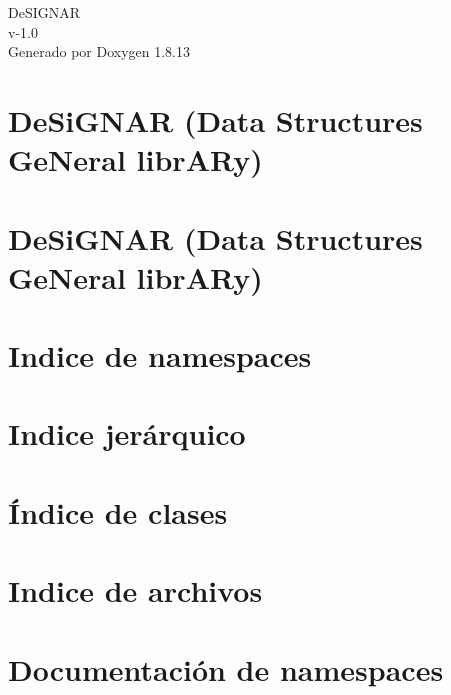 \documentclass[twoside]{book}
\newcommand{\+}{\discretionary{\mbox{\scriptsize$\hookleftarrow$}}{}{}}
\newcommand{\clearemptydoublepage}{%
  \newpage{\pagestyle{empty}\cleardoublepage}%
}
\begin{document}
\hypersetup{pageanchor=false,
             bookmarksnumbered=true,
             pdfencoding=unicode
            }
\begin{titlepage}
\vspace*{7cm}
\begin{center}%
{\Large De\+S\+I\+G\+N\+AR \\[1ex]\large v-\/1.\+0 }\\
\vspace*{1cm}
{\large Generado por Doxygen 1.8.13}\\
\end{center}
\end{titlepage}
\clearemptydoublepage
{}
\tableofcontents
\clearemptydoublepage
{}
\hypersetup{pageanchor=true}

\chapter{De\+Si\+G\+N\+AR (Data Structures Ge\+Neral libr\+A\+Ry)}
\label{index}\hypertarget{index}{}
\chapter{De\+Si\+G\+N\+AR (Data Structures Ge\+Neral libr\+A\+Ry)}
\label{md__r_e_a_d_m_e}

\chapter{Indice de namespaces}

\chapter{Indice jerárquico}

\chapter{Índice de clases}

\chapter{Indice de archivos}

\chapter{Documentación de namespaces}

\end{document}
